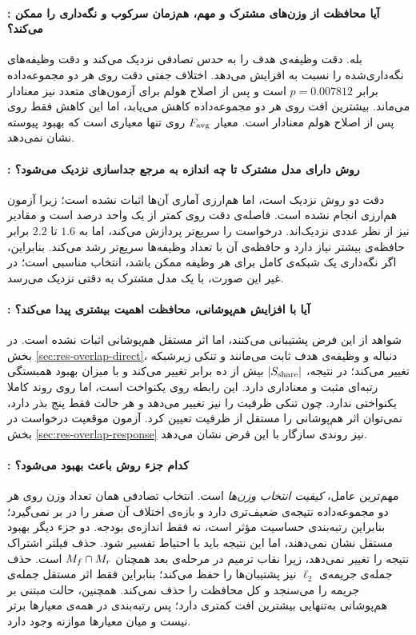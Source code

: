 \paragraph{: آیا محافظت از وزن‌های مشترک و مهم، هم‌زمان سرکوب و نگه‌داری را ممکن می‌کند؟} بله.  دقت وظیفه‌ی هدف را به حدس تصادفی نزدیک می‌کند و دقت وظیفه‌های نگه‌داری‌شده را نسبت به  افزایش می‌دهد. اختلاف جفتی دقت روی هر دو مجموعه‌داده برابر $p=0.007812$ است و پس از اصلاح هولم برای آزمون‌های متعدد نیز معنادار می‌ماند. بیشترین افت روی هر دو مجموعه‌داده کاهش می‌یابد، اما این کاهش فقط روی  پس از اصلاح هولم معنادار است. معیار $F_{\mathrm{avg}}$ روی  تنها معیاری است که بهبود پیوسته نشان نمی‌دهد.

\paragraph{: روش دارای مدل مشترک تا چه اندازه به مرجع جداسازی نزدیک می‌شود؟} دقت دو روش نزدیک است، اما هم‌ارزی آماری آن‌ها اثبات نشده است؛ زیرا آزمون هم‌ارزی انجام نشده است. فاصله‌ی دقت روی  کمتر از یک واحد درصد است و مقادیر  نیز از نظر عددی نزدیک‌اند.  درخواست را سریع‌تر پردازش می‌کند، اما به $1.6$ تا $2.2$ برابر حافظه‌ی بیشتر نیاز دارد و حافظه‌ی آن با تعداد وظیفه‌ها سریع‌تر رشد می‌کند. بنابراین، اگر نگه‌داری یک شبکه‌ی کامل برای هر وظیفه ممکن باشد،  انتخاب مناسبی است؛ در غیر این صورت،  با یک مدل مشترک به دقتی نزدیک می‌رسد.

\paragraph{: آیا با افزایش هم‌پوشانی، محافظت اهمیت بیشتری پیدا می‌کند؟} شواهد از این فرض پشتیبانی می‌کنند، اما اثر مستقل هم‌پوشانی اثبات نشده است. در بخش \ref{sec:res-overlap-direct}، دنباله و وظیفه‌ی هدف ثابت می‌مانند و تنکی زیرشبکه تغییر می‌کند؛ در نتیجه، $|S_{\mathrm{share}}|$ بیش از ده برابر تغییر می‌کند و با میزان بهبود همبستگی رتبه‌ای مثبت و معناداری دارد. این رابطه روی  یکنواخت است، اما روی  روند کاملا یکنواختی ندارد. چون تنکی ظرفیت را نیز تغییر می‌دهد و هر حالت فقط پنج بذر دارد، نمی‌توان اثر هم‌پوشانی را مستقل از ظرفیت تعیین کرد. آزمون موقعیت درخواست در بخش \ref{sec:res-overlap-response} نیز روندی سازگار با این فرض نشان می‌دهد.

\paragraph{: کدام جزء روش باعث بهبود می‌شود؟} مهم‌ترین عامل، \emph{کیفیت انتخاب وزن‌ها} است. انتخاب تصادفی همان تعداد وزن روی هر دو مجموعه‌داده نتیجه‌ی ضعیف‌تری دارد و بازه‌ی اختلاف آن صفر را در بر نمی‌گیرد؛ بنابراین رتبه‌بندی حساسیت مؤثر است، نه فقط اندازه‌ی بودجه. دو جزء دیگر بهبود مستقل نشان نمی‌دهند، اما این نتیجه باید با احتیاط تفسیر شود. حذف فیلتر اشتراک نتیجه را تغییر نمی‌دهد، زیرا نقاب ترمیم در مرحله‌ی بعد همچنان $M_f\cap M_r$ است. حذف جمله‌ی جریمه‌ی $\ell_2$ نیز پشتیبان‌ها را حفظ می‌کند؛ بنابراین فقط اثر مستقل جمله‌ی جریمه را می‌سنجد و کل محافظت را حذف نمی‌کند. همچنین، حالت مبتنی بر هم‌پوشانی به‌تنهایی بیشترین افت کمتری دارد؛ پس رتبه‌بندی در همه‌ی معیارها برتر نیست و میان معیارها موازنه وجود دارد.

